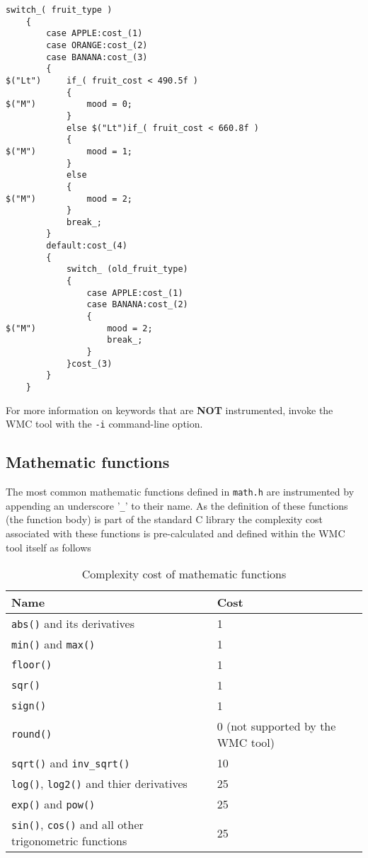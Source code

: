 \begin{Verbatim}[fontsize=\small]
    switch_( fruit_type )
    {
        case APPLE:cost_(1)
        case ORANGE:cost_(2)
        case BANANA:cost_(3)
        {
$("Lt")     if_( fruit_cost < 490.5f )
            {
$("M")          mood = 0;
            }
            else $("Lt")if_( fruit_cost < 660.8f )
            {
$("M")          mood = 1;
            }
            else
            {
$("M")          mood = 2;
            }
            break_;
        }
        default:cost_(4)
        {
            switch_ (old_fruit_type)
            {
                case APPLE:cost_(1)
                case BANANA:cost_(2)
                {
$("M")              mood = 2;
                    break_;
                }
            }cost_(3)
        }
    }
\end{Verbatim}

For more information on keywords that are \textbf{NOT} instrumented, invoke the WMC tool with the \verb|-i| command-line option.

\subsection{Mathematic functions}

The most common mathematic functions defined in \verb|math.h| are instrumented by appending an underscore '\verb|_|' to their name. As the definition of these functions (the function body) is part of the standard C library the complexity cost associated with these functions is pre-calculated and defined within the WMC tool itself as follows

\begin{table}[!hb]
\centering\small
\caption{Complexity cost of mathematic functions}
\begin{tabular}{|l|l|}
\hline
\textbf{Name} & \textbf{Cost} \\
\hline
\verb|abs()| and its derivatives & 1 \\
\verb|min()| and \verb|max()| & 1 \\
\verb|floor()| & 1 \\
\verb|sqr()| & 1 \\
\verb|sign()| & 1 \\
\verb|round()| & 0 (not supported by the WMC tool) \\
\verb|sqrt()| and \verb|inv_sqrt()| & 10 \\
\verb|log()|, \verb|log2()| and thier derivatives & 25 \\
\verb|exp()| and \verb|pow()| & 25 \\
\verb|sin()|, \verb|cos()| and all other trigonometric functions & 25 \\
\hline
\end{tabular}
\label{tab:cost_of_math_functions}
\end{table}


